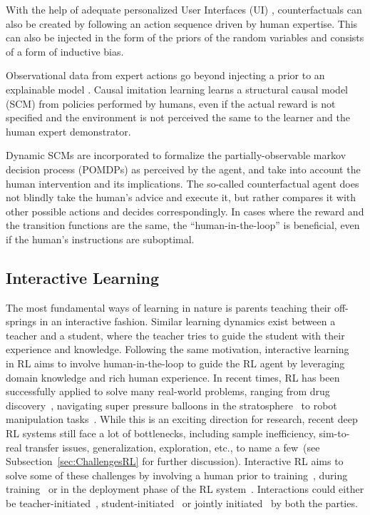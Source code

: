 \documentclass[twoside,11pt]{article}
\begin{document}
\begin{enumerate}
With the help of adequate personalized User Interfaces (UI) \citep{Sun:2021:TopologyPerturbationGNNs}, counterfactuals can also be created by following an action sequence driven by human expertise. This can also be injected in the form of the priors of the random variables and consists of a form of inductive bias.

Observational data from expert actions go beyond injecting a prior to an explainable model \citep{Zhang:2020:CausalImitationLearning}. Causal imitation learning learns a structural causal model (SCM) \citep{Pearl:2000:ModelsReasoningInference} from policies performed by humans, even if the actual reward is not specified and the environment is not perceived the same to the learner and the human expert demonstrator. 

Dynamic SCMs are incorporated to formalize the partially-observable markov decision process (POMDPs) \citep{SuttonBarto:2018:RLIntroduction} as perceived by the agent, and take into account the human intervention and its implications. The so-called counterfactual agent does not blindly take the human's advice and execute it, but rather compares it with other possible actions and decides correspondingly. In cases where the reward and the transition functions are the same, the ``human-in-the-loop'' is beneficial, even if the human's instructions are suboptimal.

\subsection{Interactive Learning}
\label{sec:InteractiveLearning}
    
The most fundamental ways of learning in nature is parents teaching their off-springs in an interactive fashion. Similar learning dynamics exist between a teacher and a student, where the teacher tries to guide the student with their experience and knowledge. Following the same motivation, interactive learning~\citep{Arzate:2020:SurveyInteractiveRL} in RL aims to involve human-in-the-loop to guide the RL agent by leveraging domain knowledge and rich human experience. In recent times,  RL has been successfully applied to solve many real-world problems, ranging from drug discovery~\citep{popova2018deep}, navigating super pressure balloons in the stratosphere~\citep{bellemare2020autonomous} to robot manipulation tasks~\citep{nguyen2019review}. While this is an exciting direction for research, recent deep RL systems still face a lot of bottlenecks, including sample inefficiency, sim-to-real transfer issues, generalization, exploration, etc., to name a few~(see Subsection~\ref{sec:ChallengesRL} for further discussion)\citep{ibarz2021train}. Interactive RL aims to solve some of these challenges by involving a human prior to training~\citep{Guo:2022:RLSurveyHumanPriorKnowledge}, during training~\citep{Knox:2008:TAMER} or in the deployment phase of the RL system~\citep{guo2021edge}. Interactions could either be teacher-initiated~\citep{torrey2013teaching}, student-initiated~\citep{da2020uncertainty,MandelEtAl:2017ActionsInHITL} or jointly initiated~\citep{amir2016interactive} by both the parties.


\end{enumerate}
\end{document}
